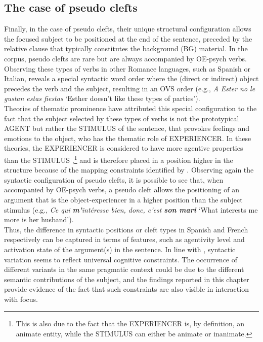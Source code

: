 \subsection{The case of pseudo clefts}
Finally, in the case of pseudo clefts, their unique structural configuration allows the focused subject to be positioned at the end of the sentence, preceded by the relative clause that typically constitutes the background (BG) material. In the corpus, pseudo clefts are rare but are always accompanied by OE-psych verbs. Observing these types of verbs in other Romance languages, such as Spanish or Italian, reveals a special syntactic word order where the (direct or indirect) object precedes the verb and the subject, resulting in an OVS order (e.g., \textit{A Ester no le gustan estas fiestas} `Esther doesn’t like these types of parties').\\
Theories of thematic prominence have attributed this special configuration to the fact that the subject selected by these types of verbs is not the prototypical {\selectfont AGENT} but rather the {\selectfont STIMULUS} of the sentence, that provokes feelings and emotions to the object, who has the thematic role of {\selectfont EXPERIENCER}. In these theories, the {\selectfont EXPERIENCER} is considered to have more agentive properties than the {\selectfont STIMULUS} \parencite{gutierrez2013structural},\footnote{This is also due to the fact that the {\selectfont EXPERIENCER} is, by definition, an animate entity, while the {\selectfont STIMULUS} can either be animate or inanimate.} and is therefore placed in a position higher in the structure because of the mapping constraints identified by \textcite{lambrecht2010constraints}. Observing again the syntactic configuration of pseudo clefts, it is possible to see that, when accompanied by OE-psych verbs, a pseudo cleft allows the positioning of an argument that is the object-experiencer in a higher position than the subject stimulus (e.g., \textit{Ce qui \textbf{m'}intéresse bien, donc, c'est \textbf{{son mari}}} `What interests me more is her husband').\\
Thus, the difference in syntactic positions or cleft types in Spanish and French respectively can be captured in terms of features, such as agentivity level and activation state of the argument(s) in the sentence. In line with \textcite{lambrecht2010constraints}, syntactic variation seems to reflect universal cognitive constraints. The occurrence of different variants in the same pragmatic context could be due to the different semantic contributions of the subject, and the findings reported in this chapter provide evidence of the fact that such constraints are also visible in interaction with focus.

